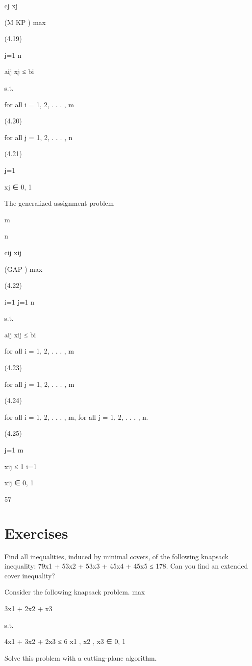 cj xj

(M KP ) max

(4.19)

j=1
n

aij xj ≤ bi

s.t.

for all i = 1, 2, . . . , m

(4.20)

for all j = 1, 2, . . . , n

(4.21)

j=1

xj ∈ {0, 1}

The generalized assignment problem

m

n

cij xij

(GAP ) max

(4.22)

i=1 j=1
n

s.t.

aij xij ≤ bi

for all i = 1, 2, . . . , m

(4.23)

for all j = 1, 2, . . . , m

(4.24)

for all i = 1, 2, . . . , m, for all j = 1, 2, . . . , n.

(4.25)

j=1
m

xij ≤ 1
i=1

xij ∈ {0, 1}

57

\section*{Exercises}
\begin{exercise}
Find all inequalities, induced by minimal covers, of the following knapsack inequality:
79x1 + 53x2 + 53x3 + 45x4 + 45x5 ≤ 178.
Can you find an extended cover inequality?
\end{exercise}

\begin{exercise}
Consider the following knapsack problem.
max

3x1 + 2x2 + x3

s.t.

4x1 + 3x2 + 2x3 ≤ 6
x1 , x2 , x3 ∈ {0, 1}

Solve this problem with a cutting-plane algorithm.
\end{exercise}

